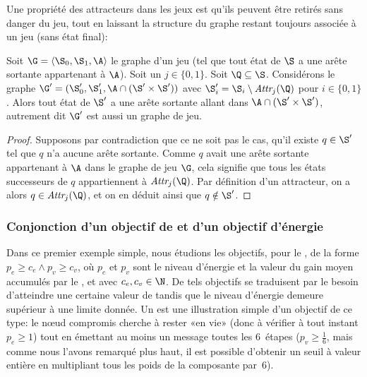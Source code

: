 Une propriété des attracteurs dans les jeux est qu'ils peuvent être retirés sans danger du jeu, tout en laissant la structure du graphe restant toujours associée à un jeu (\cad sans état final):
\begin{lemma}\label{tj:lem:removeattr}
Soit $\G = \langle \S_0, \S_1, \A\rangle$ le graphe d'un jeu (\cad tel que tout état de $\S$ a une arête sortante appartenant à $\A$).
Soit un  $j \in \{0,1\}$.
Soit $\Q \subseteq \S$.
Considérons le graphe $\G' = (\S_0', \S_1', \A \cap (\S' \times \S'))$ avec $\S_i' = \S_i \setminus \attractor{j}(\Q)$ pour $i \in \{0,1\}$.
Alors tout état de $\S'$ a une arête sortante allant dans $\A \cap (\S' \times \S')$, autrement dit $\G'$ est aussi un graphe de jeu.
\end{lemma}

\begin{proof}
Supposons par contradiction que ce ne soit pas le cas, \cad qu'il existe $q \in \S'$ tel que $q$ n'a aucune arête sortante.
Comme $q$ avait une arête sortante appartenant à $\A$ dans le graphe de jeu $\G$, cela signifie que tous les états successeurs de $q$ appartiennent à $\attractor{j}(\Q)$.
Par définition d'un attracteur, on a alors $q \in \attractor{j}(\Q)$, et on en déduit ainsi que $q \notin \S'$.
\end{proof}

\subsubsection{Conjonction d'un objectif de  et d'un objectif d'énergie}

Dans ce premier exemple simple, nous étudions les objectifs, pour le \jo, de la forme $p_e \geq c_e \wedge p_v \geq c_v$, où $p_e$ et $p_v$ sont le niveau d'énergie et la valeur du gain moyen accumulés par le \jo, et avec $c_e, c_v \in \N$.
De tels objectifs se traduisent par le besoin d'atteindre une certaine valeur de  tandis que le niveau d'énergie demeure supérieur à une limite donnée.
Un  est une illustration simple d'un objectif de ce type: le nœud compromis cherche à rester «en vie» (donc à vérifier à tout instant $p_e \geq 1$) tout en émettant au moins un message toutes les 6~étapes ($p_v \geq \frac1{6}$, mais comme nous l'avons remarqué plus haut, il est possible d'obtenir un seuil à valeur entière en multipliant tous les poids de la composante par~6).

